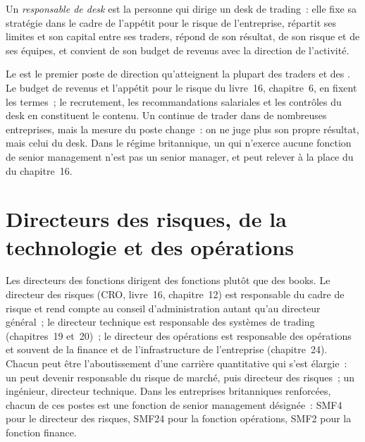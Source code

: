 \begin{definition}\label{def:in:leadership-roles:head}
Un \emph{responsable de desk} est la personne qui dirige un desk de trading~: elle fixe sa stratégie dans le cadre
de l'appétit pour le risque de l'entreprise, répartit ses limites et son capital entre ses traders, répond de son résultat, de son risque
et de ses équipes, et convient de son budget de revenus avec la direction de l'activité.
\end{definition}

Le  est le premier poste de direction qu'atteignent la plupart des traders et des . Le budget de revenus et
l'appétit pour le risque du livre~16, chapitre~6, en fixent les termes~; le recrutement, les recommandations salariales et les contrôles du desk en constituent le contenu.
Un  continue de trader dans de nombreuses entreprises, mais la mesure du poste change~: on ne juge plus son propre résultat, mais
celui du desk. Dans le régime britannique, un  qui n'exerce aucune fonction de senior management n'est pas un senior manager, et peut relever
à la place du  du chapitre~16.

\section{Directeurs des risques, de la technologie et des opérations}

Les directeurs des fonctions dirigent des fonctions plutôt que des books. Le directeur des risques (CRO, livre~16, chapitre~12) est responsable
du cadre de risque et rend compte au conseil d'administration autant qu'au directeur général~; le directeur technique est responsable des systèmes de trading
(chapitres~19 et~20)~; le directeur des opérations est responsable des opérations et souvent de la finance et de l'infrastructure de l'entreprise (chapitre~24).
Chacun peut être l'aboutissement d'une carrière quantitative qui s'est élargie~: un  peut devenir responsable du risque de marché,
puis directeur des risques~; un ingénieur, directeur technique. Dans les entreprises britanniques renforcées, chacun de ces postes est une fonction de senior management désignée~: SMF4 pour le directeur des risques,
SMF24 pour la fonction opérations,
SMF2 pour la fonction finance.

